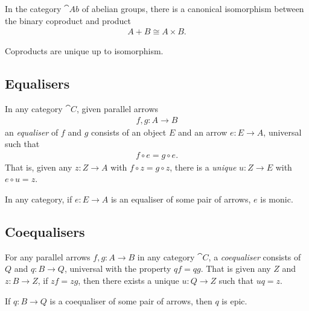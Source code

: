 \documentclass{article}
\begin{document}
\begin{proposition}[Awodey 3.11]
    In the category $\cat{Ab}$ of abelian groups, there is a canonical isomorphism between the binary
    coproduct and product
    \begin{align*}
        A + B \cong A \times B.
    \end{align*}
\end{proposition}

\begin{proposition}[Awodey 3.12]
    Coproducts are unique up to isomorphism.
\end{proposition}

\subsection{Equalisers}

\begin{definition}
    In any category $\cat C$, given parallel arrows 
    \begin{align*}
        f,g: A\to B
    \end{align*}
    an \emph{equaliser} of $f$ and $g$ consists of an object $E$ and an arrow $e:E\to A$,
    universal such that
    \begin{align*}
        f \circ e = g \circ e.
    \end{align*}
    That is, given any $z:Z\to A$ with $f\circ z=g\circ z$, there is a \emph{unique}
    $u:Z\to E$ with $e\circ u = z$.
\end{definition}

\begin{proposition}[Awodey 3.16]
    In any category, if $e:E\to A$ is an equaliser of some pair of arrows, $e$ is monic.
\end{proposition}

\subsection{Coequalisers}

\begin{definition}
    For any parallel arrows $f,g:A\to B$ in any category $\cat C$, a \emph{coequaliser}
    consists of $Q$ and $q:B\to Q$, universal with the property $qf=qg$. That is given
    any $Z$ and $z:B\to Z$, if $zf=zg$, then there exists a unique $u:Q\to Z$ such that
    $uq=z$.
\end{definition}

\begin{proposition}[Awodey 3.19]
    If $q:B\to Q$ is a coequaliser of some pair of arrows, then $q$ is epic.
\end{proposition}
\end{document}
